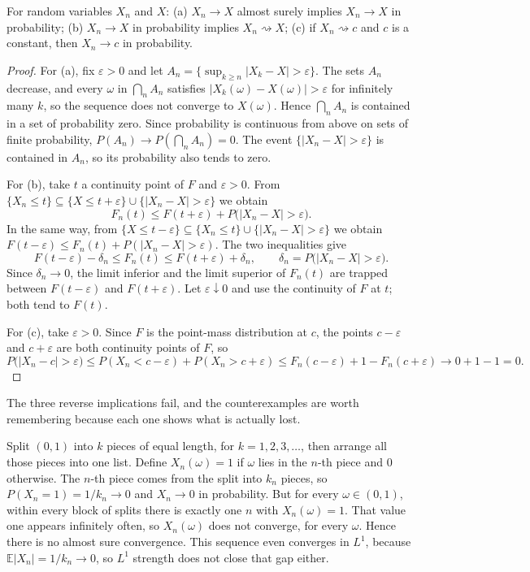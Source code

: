 \begin{teorema}
For random variables $X_n$ and $X$:
(a) $X_n\to X$ almost surely implies $X_n\to X$ in probability;
(b) $X_n\to X$ in probability implies $X_n\rightsquigarrow X$;
(c) if $X_n\rightsquigarrow c$ and $c$ is a constant, then $X_n\to c$ in
probability.
\end{teorema}

\begin{proof}[Proof]
For (a), fix $\varepsilon>0$ and let
$A_n=\{\sup_{k\ge n}|X_k-X|>\varepsilon\}$. The sets $A_n$ decrease, and every
$\omega$ in $\bigcap_n A_n$ satisfies $|X_k(\omega)-X(\omega)|>\varepsilon$ for
infinitely many $k$, so the sequence does not converge to $X(\omega)$. Hence
$\bigcap_n A_n$ is contained in a set of probability zero. Since probability is
continuous from above on sets of finite probability,
$P(A_n)\to P(\bigcap_n A_n)=0$. The event $\{|X_n-X|>\varepsilon\}$ is contained in
$A_n$, so its probability also tends to zero.

For (b), take $t$ a continuity point of $F$ and $\varepsilon>0$. From
$\{X_n\le t\}\subseteq\{X\le t+\varepsilon\}\cup\{|X_n-X|>\varepsilon\}$ we obtain
\[
F_n(t)\le F(t+\varepsilon)+P\bigl(|X_n-X|>\varepsilon\bigr).
\]
In the same way, from $\{X\le t-\varepsilon\}\subseteq\{X_n\le t\}\cup
\{|X_n-X|>\varepsilon\}$ we obtain
$F(t-\varepsilon)\le F_n(t)+P(|X_n-X|>\varepsilon)$. The two inequalities give
\[
F(t-\varepsilon)-\delta_n\le F_n(t)\le F(t+\varepsilon)+\delta_n,
\qquad \delta_n=P\bigl(|X_n-X|>\varepsilon\bigr).
\]
Since $\delta_n\to0$, the limit inferior and the limit superior of $F_n(t)$ are
trapped between $F(t-\varepsilon)$ and $F(t+\varepsilon)$. Let
$\varepsilon\downarrow0$ and use the continuity of $F$ at $t$; both tend to $F(t)$.

For (c), take $\varepsilon>0$. Since $F$ is the point-mass distribution at $c$, the
points $c-\varepsilon$ and $c+\varepsilon$ are both continuity points of $F$, so
\[
P\bigl(|X_n-c|>\varepsilon\bigr)
\le P(X_n<c-\varepsilon)+P(X_n>c+\varepsilon)
\le F_n(c-\varepsilon)+1-F_n(c+\varepsilon)
\to 0+1-1=0 .
\]
\end{proof}

The three reverse implications fail, and the counterexamples are worth remembering
because each one shows what is actually lost.

\begin{contoh}
Split $(0,1)$ into $k$ pieces of equal length, for $k=1,2,3,\dots$, then arrange all
those pieces into one list. Define $X_n(\omega)=1$ if $\omega$ lies in the $n$-th
piece and $0$ otherwise. The $n$-th piece comes from the split into $k_n$ pieces, so
$P(X_n=1)=1/k_n\to0$ and $X_n\to0$ in probability. But for every
$\omega\in(0,1)$, within every block of splits there is exactly one $n$ with
$X_n(\omega)=1$. That value one appears infinitely often, so $X_n(\omega)$ does not
converge, for every $\omega$. Hence there is no almost sure convergence. This
sequence even converges in $L^1$, because $\mathbb{E}|X_n|=1/k_n\to0$, so $L^1$
strength does not close that gap either.
\end{contoh}

